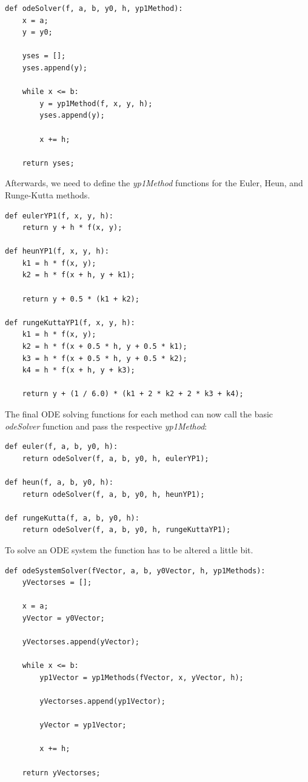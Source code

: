 \begin{lstlisting}[caption=Function to solve ODE]
def odeSolver(f, a, b, y0, h, yp1Method):
	x = a;
	y = y0;
	
	yses = [];
	yses.append(y);
	
	while x <= b:
		y = yp1Method(f, x, y, h);
		yses.append(y);
		
		x += h;
	
	return yses;
\end{lstlisting}

Afterwards, we need to define the \textit{yp1Method} functions for the Euler, Heun, and Runge-Kutta methods.

\begin{lstlisting}[caption=YP1Methods]
def eulerYP1(f, x, y, h):
	return y + h * f(x, y);

def heunYP1(f, x, y, h):
	k1 = h * f(x, y);
	k2 = h * f(x + h, y + k1);
	
	return y + 0.5 * (k1 + k2);

def rungeKuttaYP1(f, x, y, h):
	k1 = h * f(x, y);
	k2 = h * f(x + 0.5 * h, y + 0.5 * k1);
	k3 = h * f(x + 0.5 * h, y + 0.5 * k2);
	k4 = h * f(x + h, y + k3);
	
	return y + (1 / 6.0) * (k1 + 2 * k2 + 2 * k3 + k4);
\end{lstlisting}

The final ODE solving functions for each method can now call the basic \textit{odeSolver} function and pass the respective \textit{yp1Method}:

\begin{lstlisting}[caption=ODE solving functions for each method]
def euler(f, a, b, y0, h):
	return odeSolver(f, a, b, y0, h, eulerYP1);

def heun(f, a, b, y0, h):
	return odeSolver(f, a, b, y0, h, heunYP1);

def rungeKutta(f, a, b, y0, h):
	return odeSolver(f, a, b, y0, h, rungeKuttaYP1);
\end{lstlisting}

To solve an ODE system the function has to be altered a little bit.

\begin{lstlisting}[caption=Function to solve an ODE system]
def odeSystemSolver(fVector, a, b, y0Vector, h, yp1Methods):
	yVectorses = [];
	
	x = a;
	yVector = y0Vector;
	
	yVectorses.append(yVector);
	
	while x <= b:
		yp1Vector = yp1Methods(fVector, x, yVector, h);
		
		yVectorses.append(yp1Vector);
		
		yVector = yp1Vector;
		
		x += h;
	
	return yVectorses;
\end{lstlisting}

